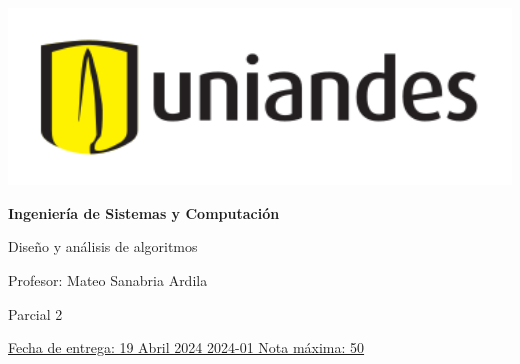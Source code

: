 \documentclass[12pt, a4paper]{exam}
\begin{document}
	\noindent
	\begin{minipage}[l]{0.1\textwidth}
		\noindent
		\includegraphics[width=1.8\textwidth]{Logosimbolo-uniandes_horizontal.png}
	\end{minipage}
\hfill
\begin{minipage}[c]{0.8\textwidth}
	\begin{center}
		{\large \textbf{Ingeniería de Sistemas y Computación} \par
		\large	Diseño y análisis de algoritmos	\par
		\small  Profesor: Mateo Sanabria Ardila	\par
		\small  Parcial 2	\par
		}
	\end{center}
\end{minipage}
\par
\vspace{0.2in}
\noindent
\uline{Fecha de entrega: 19 Abril 2024	\hfill  2024-01		\hfill Nota máxima: 50}
\par 
\vspace{0.15in}
\end{document}
